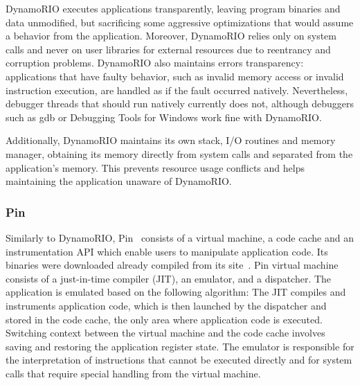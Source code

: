 \documentclass[11pt,twoside]{article}
\begin{document}
  DynamoRIO executes applications transparently,
  leaving program binaries and data unmodified, but
  sacrificing some aggressive optimizations that would assume
  a behavior from the application. Moreover, DynamoRIO relies only
  on system calls and never on user libraries for external
  resources due to reentrancy and corruption 
  problems.
  DynamoRIO also maintains errors transparency:
  applications that have faulty behavior, such as
  invalid memory access or invalid instruction execution,
  are handled as if the fault occurred natively. Nevertheless,
  debugger threads that should run natively currently does not,
  although debuggers such as gdb or Debugging Tools for Windows
  work fine with DynamoRIO.
  
  Additionally,
  DynamoRIO maintains its own stack, I/O routines and
  memory manager, obtaining its memory directly from system
  calls and separated from the application's memory. This
  prevents resource usage conflicts and helps maintaining
  the application unaware of DynamoRIO.
\subsubsection{Pin}
  Similarly to DynamoRIO, Pin~\cite{pin} consists of
  a virtual machine, a code cache and an instrumentation API
  which enable users to manipulate application code.
  Its binaries were downloaded already
  compiled from its site~\cite{pinsrc}.
  Pin virtual
  machine consists of a just-in-time compiler (JIT), an emulator,
  and a dispatcher. The application is emulated based on the
  following algorithm:
  The JIT compiles and instruments application code, which is then
  launched by the dispatcher and stored in the code cache, the
  only area where application code is executed.
  Switching context between the virtual machine and the code cache
  involves saving and restoring the application register state.
  The emulator is responsible for the interpretation of
  instructions that cannot be executed directly and for system
  calls that require special handling from the virtual machine.
\end{document}
